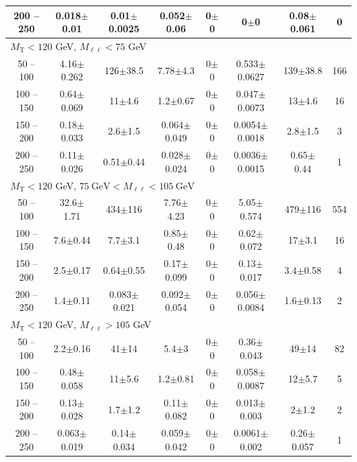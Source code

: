 \begin{table}
\begin{center}
\begin{tabular}{| c | c c c c c c c | }
200 -- 250&0.018$\pm$0.01&0.01$\pm$0.0025&0.052$\pm$0.06&0$\pm$0&0$\pm$0&0.08$\pm$0.061&0\\
\hline\hline
\multicolumn{8}{l}{$M_{\text{T}} < 120$ GeV, $M_{\ell\ell} < 75$ GeV}\\\hline\hline
50 -- 100&4.16$\pm$0.262&126$\pm$38.5&7.78$\pm$4.3&0$\pm$0&0.533$\pm$0.0627&139$\pm$38.8&166\\
100 -- 150&0.64$\pm$0.069&11$\pm$4.6&1.2$\pm$0.67&0$\pm$0&0.047$\pm$0.0073&13$\pm$4.6&16\\
150 -- 200&0.18$\pm$0.033&2.6$\pm$1.5&0.064$\pm$0.049&0$\pm$0&0.0054$\pm$0.0018&2.8$\pm$1.5&3\\
200 -- 250&0.11$\pm$0.026&0.51$\pm$0.44&0.028$\pm$0.024&0$\pm$0&0.0036$\pm$0.0015&0.65$\pm$0.44&1\\
\hline\hline
\multicolumn{8}{l}{$M_{\text{T}} < 120$ GeV, $75~\mathrm{GeV} < M_{\ell\ell} < 105~\mathrm{GeV}$}\\\hline\hline
50 -- 100&32.6$\pm$1.71&434$\pm$116&7.76$\pm$4.23&0$\pm$0&5.05$\pm$0.574&479$\pm$116&554\\
100 -- 150&7.6$\pm$0.44&7.7$\pm$3.1&0.85$\pm$0.48&0$\pm$0&0.62$\pm$0.072&17$\pm$3.1&16\\
150 -- 200&2.5$\pm$0.17&0.64$\pm$0.55&0.17$\pm$0.099&0$\pm$0&0.13$\pm$0.017&3.4$\pm$0.58&4\\
200 -- 250&1.4$\pm$0.11&0.083$\pm$0.021&0.092$\pm$0.054&0$\pm$0&0.056$\pm$0.0084&1.6$\pm$0.13&2\\
\hline\hline
\multicolumn{8}{l}{$M_{\text{T}} < 120$ GeV, $M_{\ell\ell} > 105$ GeV}\\\hline\hline
50 -- 100&2.2$\pm$0.16&41$\pm$14&5.4$\pm$3&0$\pm$0&0.36$\pm$0.043&49$\pm$14&82\\
100 -- 150&0.48$\pm$0.058&11$\pm$5.6&1.2$\pm$0.81&0$\pm$0&0.058$\pm$0.0087&12$\pm$5.7&5\\
150 -- 200&0.13$\pm$0.028&1.7$\pm$1.2&0.11$\pm$0.082&0$\pm$0&0.013$\pm$0.003&2$\pm$1.2&2\\
200 -- 250&0.063$\pm$0.019&0.14$\pm$0.034&0.059$\pm$0.042&0$\pm$0&0.0061$\pm$0.002&0.26$\pm$0.057&1\\
\hline\hline
\end{tabular}
\end{center}
\end{table}
\clearpage